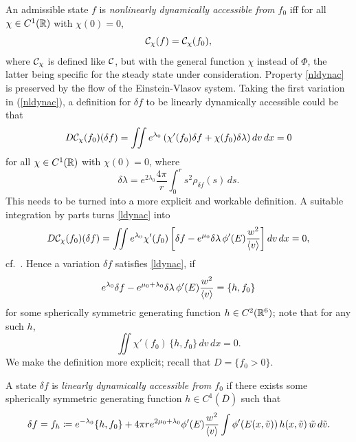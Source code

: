 \documentclass[11pt]{article}
\begin{document}
An admissible state $f$ is
{\em nonlinearly dynamically accessible from $f_0$} iff
for all $\chi \in C^1(\mathbb R)$ with $\chi(0)=0$,
\begin{equation}\label{nldynac}
  {\cal C}_\chi (f)={\cal C}_\chi (f_0),
\end{equation}
where ${\cal C}_\chi$ is defined like ${\cal C}$, but with the general function
$\chi$ instead of $\Phi$, the latter being specific for the steady state
under consideration. Property \eqref{nldynac} is preserved by the flow of
the Einstein-Vlasov system. 
Taking the first variation in (\ref{nldynac}), a
definition for $\delta f$ to be linearly dynamically accessible could
be that
\begin{equation}\label{ldynac}
  D {\cal C}_\chi(f_0)(\delta f)
  =\iint e^{\lambda_0} \left(\chi'(f_0)\delta f
  +\chi(f_0)\delta\lambda\right) dv\,dx = 0
\end{equation}
for all $\chi \in C^1(\mathbb R)$ with $\chi(0)=0$, where
\begin{equation} \label{varlambdadef}
  \delta\lambda = 
  e^{2 \lambda_0}\frac{4 \pi}{r} \int_0^r s^2 \rho_{\delta f} (s)\,ds.
\end{equation}
This needs to be turned into a more explicit and workable definition.
A suitable integration by parts turns \eqref{ldynac} into
\begin{equation} \label{ldynac2}
  D {\cal C}_\chi(f_0)(\delta f)
  =\iint e^{\lambda_0}\chi'(f_0)\left[\delta f  
  - e^{\mu_0}\delta\lambda \, \phi'(E)\frac{w^2}{\left\langle v\right\rangle }\right] dv\,dx = 0,
\end{equation}
cf.~\cite[Lemma~3.1]{HaRe2013}. Hence a variation $\delta f$ satisfies
\eqref{ldynac}, if
\begin{equation} \label{ldynacexpl}
  e^{\lambda_0} \delta f -e^{\mu_0+\lambda_0}\delta\lambda\, 
  \phi'(E)\frac{w^2}{\left\langle v\right\rangle }=\{h,f_0\}
\end{equation}
for some spherically symmetric generating function $h\in C^2(\mathbb R^6)$;
note that for any such $h$,
\[
\iint\chi'(f_0)\,\{h,f_0\}\,dv\,dx =0.
\]
We make the definition more explicit; recall that $D=\{f_0>0\}$.
%
%
\begin{definition}
  A state $\delta f$ is
  {\em linearly dynamically accessible from $f_0$} if there
  exists some spherically symmetric generating function $h\in C^1(\overline{D})$
  such that
  \begin{equation} \label{ldynacdef}
    \delta f = f_h \coloneqq
    e^{-\lambda_0}\{h,f_0\}
    +4\pi r e^{2\mu_0+\lambda_0}\phi'(E) \frac{w^2}{\left\langle v\right\rangle}
    \int \phi'(E(x,\tilde v))\,h(x,\tilde v)\,\tilde w\,d\tilde v.
  \end{equation}
\end{definition}
\end{document}
